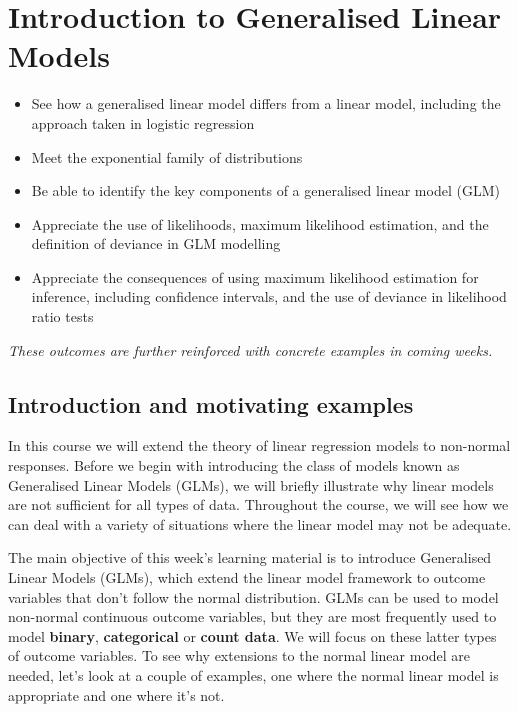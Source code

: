 \documentclass[
  a4paper,
  DIV=11,
  numbers=noendperiod]{scrreprt}
\author{}
\date{}
\newcommand{\term}[1]{\textbf{#1}}
\newenvironment{fbxSimple}[3]{\begin{tcolorbox}[enhanced, breakable,%
attach boxed title to top*={xshift=1.4pt},
boxed title style={boxrule=0.0mm, fuzzy shadow={1pt}{-1pt}{0mm}{0.1mm}{gray}, arc=.3em, rounded corners=east, sharp corners=west}, colframe=#1-color2, colbacktitle=#1-color1, colback = white, coltitle=black,  titlerule=0mm, toprule=0pt, bottomrule=.7pt, leftrule=.3em, rightrule=.7pt, outer arc=.3em,  	left=.5em, right=.5em, bottomtitle=1mm, toptitle=1mm,title=\textbf{#2}\hspace{0.5em}{#3}]}
{\end{tcolorbox}}
\begin{document}
\chapter{Introduction to Generalised Linear
Models}\label{introduction-to-generalised-linear-models}

\label{Outcomesux2a-1.1}
\begin{fbxSimple}{Outcomes}{Learning Outcomes}{}
\label{Outcomes*-1.1}

\begin{itemize}
\item
  See how a generalised linear model differs from a linear model,
  including the approach taken in logistic regression
\item
  Meet the exponential family of distributions
\item
  Be able to identify the key components of a generalised linear model
  (GLM)
\item
  Appreciate the use of likelihoods, maximum likelihood estimation, and
  the definition of deviance in GLM modelling
\item
  Appreciate the consequences of using maximum likelihood estimation for
  inference, including confidence intervals, and the use of deviance in
  likelihood ratio tests
\end{itemize}

\emph{These outcomes are further reinforced with concrete examples in
coming weeks.}

\end{fbxSimple}

\section{Introduction and motivating
examples}\label{introduction-and-motivating-examples}

In this course we will extend the theory of linear regression models to
non-normal responses. Before we begin with introducing the class of
models known as Generalised Linear Models (GLMs), we will briefly
illustrate why linear models are not sufficient for all types of data.
Throughout the course, we will see how we can deal with a variety of
situations where the linear model may not be adequate.

The main objective of this week's learning material is to introduce
Generalised Linear Models (GLMs), which extend the linear model
framework to outcome variables that don't follow the normal
distribution. GLMs can be used to model non-normal continuous outcome
variables, but they are most frequently used to model \term{binary},
\term{categorical} or \term{count data}. We will focus on these latter
types of outcome variables. To see why extensions to the normal linear
model are needed, let's look at a couple of examples, one where the
normal linear model is appropriate and one where it's not.
\end{document}
